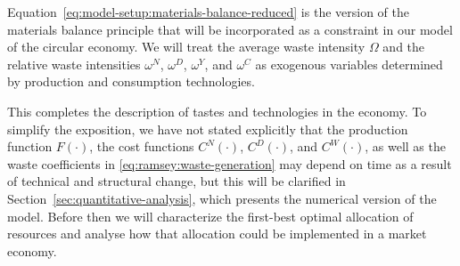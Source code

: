 Equation~\eqref{eq:model-setup:materials-balance-reduced} is the version of the materials balance principle that will be incorporated as a constraint in our model of the circular economy. We will treat the average waste intensity $\Omega$ and the relative waste intensities $\omega^N$, $\omega^D$, $\omega^Y$, and $\omega^C$ as exogenous variables determined by production and consumption technologies.

This completes the description of tastes and technologies in the economy. To simplify the exposition, we have not stated explicitly that the production function $F(\cdot)$, the cost functions $C^N(\cdot)$, $C^D(\cdot)$, and $C^W(\cdot)$, as well as the waste coefficients in \eqref{eq:ramsey:waste-generation} may depend on time as a result of technical and structural change, but this will be clarified in Section~\ref{sec:quantitative-analysis}, which presents the numerical version of the model. Before then we will characterize the first-best optimal allocation of resources and analyse how that allocation could be implemented in a market economy.
